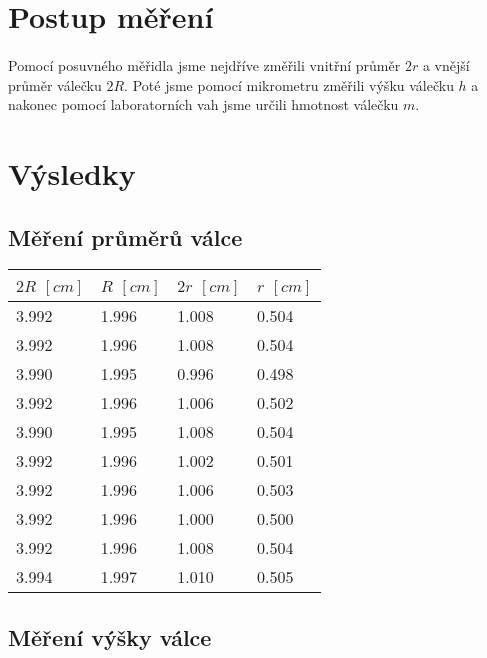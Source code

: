 \documentclass[a4paper,11pt]{article}
\begin{document}
\section{Postup měření}

    \paragraph{} Pomocí posuvného měřidla jsme nejdříve změřili vnitřní průměr $2r$ a vnější průměr 
    válečku $2R$. Poté jsme pomocí mikrometru změřili výšku válečku $h$ a nakonec pomocí laboratorních vah jsme 
    určili hmotnost válečku $m$.

\section{Výsledky}

    \subsection{Měření průměrů válce}

    \begin{center}
        \begin{tabular}{ | l | l || l | l | }
            \hline
            $2R$ $[cm]$ & $R$ $[cm]$ & $2r$ $[cm]$ & $r$ $[cm]$ \\ \hline
            3.992 & 1.996 & 1.008 & 0.504 \\ \hline
            3.992 & 1.996 & 1.008 & 0.504 \\ \hline
            3.990 & 1.995 & 0.996 & 0.498 \\ \hline
            3.992 & 1.996 & 1.006 & 0.502 \\ \hline
            3.990 & 1.995 & 1.008 & 0.504 \\ \hline
            3.992 & 1.996 & 1.002 & 0.501 \\ \hline
            3.992 & 1.996 & 1.006 & 0.503 \\ \hline
            3.992 & 1.996 & 1.000 & 0.500 \\ \hline
            3.992 & 1.996 & 1.008 & 0.504 \\ \hline
            3.994 & 1.997 & 1.010 & 0.505 \\
            \hline
        \end{tabular}
    \end{center}

    \subsection{Měření výšky válce}
\end{document}
